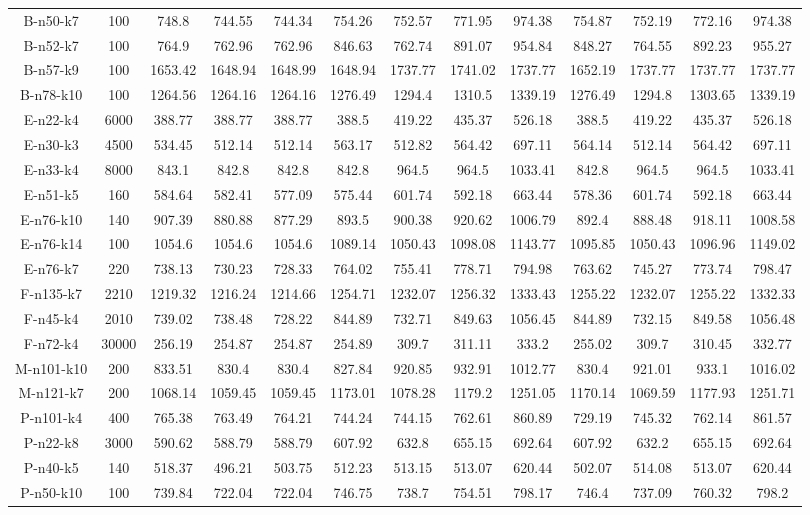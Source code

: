 \documentclass[11pt]{article} %
\begin{document}
\begin{enumerate}
\begin{landscape}
\begin{table}[p]
\begin{small}
\begin{tabular}{ccccccccccccc}
B-n50-k7&100&748.8&744.55&744.34&754.26&752.57&771.95&974.38&754.87&752.19&772.16&974.38\\
B-n52-k7&100&764.9&762.96&762.96&846.63&762.74&891.07&954.84&848.27&764.55&892.23&955.27\\
B-n57-k9&100&1653.42&1648.94&1648.99&1648.94&1737.77&1741.02&1737.77&1652.19&1737.77&1737.77&1737.77\\
B-n78-k10&100&1264.56&1264.16&1264.16&1276.49&1294.4&1310.5&1339.19&1276.49&1294.8&1303.65&1339.19\\
E-n22-k4&6000&388.77&388.77&388.77&388.5&419.22&435.37&526.18&388.5&419.22&435.37&526.18\\
E-n30-k3&4500&534.45&512.14&512.14&563.17&512.82&564.42&697.11&564.14&512.14&564.42&697.11\\
E-n33-k4&8000&843.1&842.8&842.8&842.8&964.5&964.5&1033.41&842.8&964.5&964.5&1033.41\\
E-n51-k5&160&584.64&582.41&577.09&575.44&601.74&592.18&663.44&578.36&601.74&592.18&663.44\\
E-n76-k10&140&907.39&880.88&877.29&893.5&900.38&920.62&1006.79&892.4&888.48&918.11&1008.58\\
E-n76-k14&100&1054.6&1054.6&1054.6&1089.14&1050.43&1098.08&1143.77&1095.85&1050.43&1096.96&1149.02\\
E-n76-k7&220&738.13&730.23&728.33&764.02&755.41&778.71&794.98&763.62&745.27&773.74&798.47\\
F-n135-k7&2210&1219.32&1216.24&1214.66&1254.71&1232.07&1256.32&1333.43&1255.22&1232.07&1255.22&1332.33\\
F-n45-k4&2010&739.02&738.48&728.22&844.89&732.71&849.63&1056.45&844.89&732.15&849.58&1056.48\\
F-n72-k4&30000&256.19&254.87&254.87&254.89&309.7&311.11&333.2&255.02&309.7&310.45&332.77\\
M-n101-k10&200&833.51&830.4&830.4&827.84&920.85&932.91&1012.77&830.4&921.01&933.1&1016.02\\
M-n121-k7&200&1068.14&1059.45&1059.45&1173.01&1078.28&1179.2&1251.05&1170.14&1069.59&1177.93&1251.71\\
P-n101-k4&400&765.38&763.49&764.21&744.24&744.15&762.61&860.89&729.19&745.32&762.14&861.57\\
P-n22-k8&3000&590.62&588.79&588.79&607.92&632.8&655.15&692.64&607.92&632.2&655.15&692.64\\
P-n40-k5&140&518.37&496.21&503.75&512.23&513.15&513.07&620.44&502.07&514.08&513.07&620.44\\
P-n50-k10&100&739.84&722.04&722.04&746.75&738.7&754.51&798.17&746.4&737.09&760.32&798.2\\

\end{tabular}
\end{small}
\end{table}
\end{landscape}
\end{enumerate}
\end{document}
